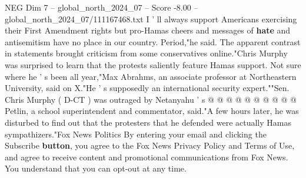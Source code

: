 \begin{textsample}{NEG Dim 7 – global\_north\_2024\_07 – Score -8.00 – global\_north\_2024\_07/111167468.txt}
I ' ll always support Americans exercising their First Amendment rights but pro-Hamas cheers and messages of \textbf{hate} and antisemitism have no place in our country.
Period,"he said.
The apparent contrast in statements brought criticism from some conservatives online."Chris Murphy was surprised to learn that the protests saliently feature Hamas support.
Not sure where he ' s been all year,"Max Abrahms, an associate professor at Northeastern University, said on X."He ' s supposedly an international security expert.""Sen.
Chris Murphy ( D-CT ) was outraged by Netanyahu ' s @ @ @ @ @ @ @ @ @ @ Petlin, a school superintendent and commentator, said."A few hours later, he was disturbed to find out that the protesters that he defended were actually Hamas sympathizers."Fox News Politics By entering your email and clicking the Subscribe \textbf{button}, you agree to the Fox News Privacy Policy and Terms of Use, and agree to receive content and promotional communications from Fox News.
You understand that you can opt-out at any time.

\end{textsample}
